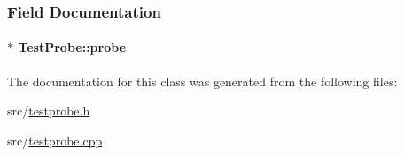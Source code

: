 \subsubsection{\-Field \-Documentation}
\hypertarget{classTestProbe_a49d9564b18f0b0469ae7ec3a6600b695}{
\paragraph[{probe}]{$\ast$ {\bf \-Test\-Probe\-::probe}}}\label{classTestProbe_a49d9564b18f0b0469ae7ec3a6600b695}


\-The documentation for this class was generated from the following files\-:\begin{DoxyCompactItemize}
\item 
src/\hyperlink{testprobe_8h}{testprobe.\-h}\item 
src/\hyperlink{testprobe_8cpp}{testprobe.\-cpp}\end{DoxyCompactItemize}
